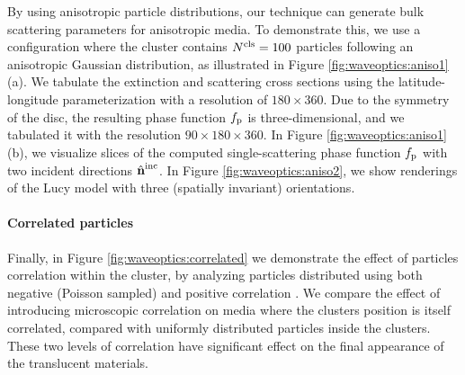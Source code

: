 By using anisotropic particle distributions, our technique can generate bulk scattering parameters for anisotropic media.
To demonstrate this, we use a configuration where the cluster contains $N^\mathrm{cls} = 100$ particles following an anisotropic Gaussian distribution, as illustrated in Figure \ref{fig:waveoptics:aniso1}(a).
We tabulate the extinction and scattering cross sections using the latitude-longitude parameterization with a resolution of $180 \times 360$.
Due to the symmetry of the disc, the resulting phase function $f_\mathrm{p}$ is three-dimensional, and we tabulated it with the resolution $90 \times 180 \times360$.
In Figure \ref{fig:waveoptics:aniso1}(b), we visualize slices of the computed single-scattering phase function $f_\mathrm{p}$ with two incident directions ${\hat{\mathbf{n}}}^\mathrm{inc}$.
In Figure \ref{fig:waveoptics:aniso2}, we show renderings of the Lucy model with three (spatially invariant) orientations.




\paragraph{Correlated particles}

Finally, in Figure \ref{fig:waveoptics:correlated} we demonstrate the effect of particles correlation within the cluster, by analyzing particles distributed using both negative (Poisson sampled) and positive correlation \cite{jarabo2018radiative}. We compare the effect of introducing microscopic correlation on media where the clusters position is itself correlated, compared with uniformly distributed particles inside the clusters. These two levels of correlation have significant effect on the final appearance of the translucent materials. 



